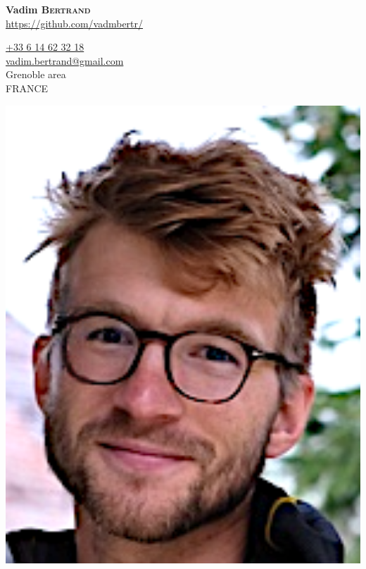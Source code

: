 \documentclass{article}
\begin{document}
\begin{minipage}{0.8\textwidth}
\begin{flushleft}
    \begin{minipage}{1\textwidth}
        \begin{minipage}{.5\textwidth}
            \vspace{.2cm}
            {\huge \textbf{Vadim \textsc{Bertrand}}}\\[.3 cm]
            \url{https://github.com/vadmbertr/}
        \end{minipage}
        \begin{minipage}{.5\textwidth}
        \begin{flushright}
            \begin{minipage}{.74\textwidth}
            \begin{flushright}
                \href{tel:33614623218}{+33 6 14 62 32 18} \\[.1 cm]
                \href{mailto:vadim.bertrand@gmail.com}{vadim.bertrand@gmail.com} \\[.1 cm]
                Grenoble area \\[.1 cm]
                FRANCE
            \end{flushright}
            \end{minipage}
            \begin{minipage}{.24\textwidth}
            \begin{flushright}
                \includegraphics[width=1\textwidth]{picture.png}

\end{flushright}
\end{minipage}
\end{flushright}
\end{minipage}
\end{minipage}
\end{flushleft}
\end{minipage}
\end{document}
